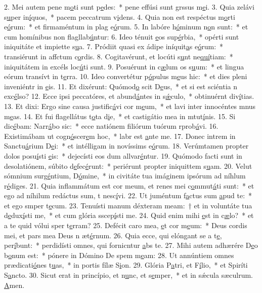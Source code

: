 2. Mei autem pene m\uline{o}ti sunt p\uline{e}des:~* pene effúsi sunt grssus m\uline{e}i.
3. Quia zelávi s\uline{u}per in\uline{í}quos,~* pacem peccatrum v\uline{i}dens.
4. Quia non est respéctus m\uline{o}rti e\uline{ó}rum:~* et firmaméntum in plag e\uline{ó}rum.
5. In labóre h\uline{ó}minum n\uline{o}n sunt:~* et cum homínibus non flagllab\uline{ú}ntur:
6. Ideo ténuit \uline{e}os sup\uline{é}rbia,~* opérti sunt iniquitáte et impiette s\uline{u}a.
7. Pródiit quasi ex ádipe iníquit\uline{a}s e\uline{ó}rum:~* transiérunt in affctum c\uline{o}rdis.
8. Cogitavérunt, et locúti s\uline{u}nt ne\uline{quí}tiam:~* iniquitátem in excéls loc\uline{ú}ti sunt.
9. Posuérunt in c\uline{æ}lum os s\uline{u}um:~* et lingua eórum transívt in t\uline{e}rra.
10. Ideo convertétur p\uline{ó}pulus m\uline{e}us hic:~* et dies pleni inveniéntr in \uline{e}is.
11. Et dixérunt: Quómod\uline{o} scit D\uline{e}us,~* et si est sciéntia n exc\uline{é}lso?
12. Ecce ipsi peccatóres, et abund\uline{á}ntes in s\uline{ǽ}culo,~* obtinuérnt div\uline{í}tias.
13. Et dixi: Ergo sine causa justific\uline{á}vi cor m\uline{e}um,~* et lavi inter innocéntes mnus m\uline{e}as.
14. Et fui flagellátus t\uline{o}ta d\uline{i}e,~* et castigátio mea in mtut\uline{í}nis.
15. Si dic\uline{é}bam: Narr\uline{á}bo sic:~* ecce natiónem filiórum tuórum rprob\uline{á}vi.
16. Existimábam ut cogn\uline{ó}scer\uline{e}m hoc,~* labr est \uline{a}nte me.
17. Donec intrem in Sanctu\uline{á}rium D\uline{e}i:~* et intélligam in novíssims e\uline{ó}rum.
18. Verúmtamen propter dolos posu\uline{í}sti \uline{e}is:~* dejecísti eos dum allvar\uline{é}ntur.
19. Quómodo facti sunt in desolatiónem, súbito d\uline{e}fec\uline{é}runt:~* periérunt propter iniquittem s\uline{u}am.
20. Velut sómnium surg\uline{é}ntium, D\uline{ó}mine,~* in civitáte tua imáginem ipsórum ad níhlum r\uline{é}diges.
21. Quia inflammátum est cor meum, et renes mei c\uline{o}mmut\uline{á}ti sunt:~* et ego ad níhilum redáctus sum, t nesc\uline{í}vi.
22. Ut juméntum f\uline{a}ctus sum \uline{a}pud te:~* et ego smper t\uline{e}cum.
23. Tenuísti manum déxteram meam:~† et in voluntáte tua d\uline{e}dux\uline{í}sti me,~* et cum glória sscep\uline{í}sti me.
24. Quid enim mihi \uline{e}st in c\uline{æ}lo?~* et a te quid vólui sper t\uline{e}rram?
25. Defécit caro mea, \uline{e}t cor m\uline{e}um:~* Deus cordis mei, et pars mea Deus n æt\uline{é}rnum.
26. Quia ecce, qui elóngant se a t\uline{e}, per\uline{í}bunt:~* perdidísti omnes, qui fornicntur \uline{a}bs te.
27. Mihi autem adhærére D\uline{e}o b\uline{o}num est:~* pónere in Dómino De spem m\uline{e}am:
28. Ut annúntiem omnes prædicati\uline{ó}nes t\uline{u}as,~* in portis fílæ S\uline{i}on.
29. Glória P\uline{a}tri, et F\uline{í}lio,~* et Spiríti S\uline{a}ncto.
30. Sicut erat in princípio, et n\uline{u}nc, et s\uline{e}mper,~* et in sǽcula sæculrum. \uline{A}men.

